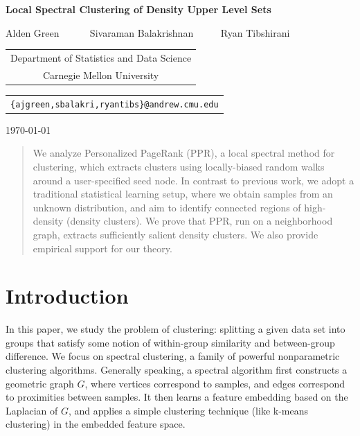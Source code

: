 \documentclass[11pt,twoside]{article}
\newcommand{\1}{\mathbf{1}}
\begin{document}
\begin{center} {\Large{\bf{Local Spectral Clustering of Density Upper Level Sets}}}

\vspace*{.3cm}

{\large{
\begin{center}
Alden Green ~~~~~ Sivaraman Balakrishnan~~~~~ Ryan Tibshirani\\
\vspace{.2cm}
\end{center}


\begin{tabular}{c}
Department of Statistics and Data Science \\
Carnegie Mellon University
\end{tabular}

\vspace*{.2in}

\begin{tabular}{c}
\texttt{\{ajgreen,sbalakri,ryantibs\}@andrew.cmu.edu}
\end{tabular}
}}

\vspace*{.2in}

\today
\vspace*{.2in}

\begin{abstract}
\noindent We analyze Personalized PageRank (PPR), a local spectral method for clustering,
which extracts clusters using locally-biased random walks around a user-specified
seed node.  In contrast to previous work, we adopt a traditional statistical
learning setup, where we obtain samples from an unknown distribution, and aim to
identify connected regions of high-density (density clusters).  We prove that
PPR, run on a neighborhood graph, extracts sufficiently salient density
clusters. We also provide empirical support for our theory.
\end{abstract}
\end{center}
\section{Introduction}
\label{sec: introduction}

In this paper, we study the problem of clustering: splitting a given data set
into groups that satisfy some notion of within-group similarity and
between-group difference.  We focus on spectral clustering, a family of powerful
nonparametric clustering algorithms.  Generally speaking, a spectral algorithm
first constructs a geometric graph $G$, where vertices correspond to samples,
and edges correspond to proximities between samples. It then learns a feature
embedding based on the Laplacian of $G$, and applies a simple clustering
technique (like k-means clustering) in the embedded feature space.
\end{document}
